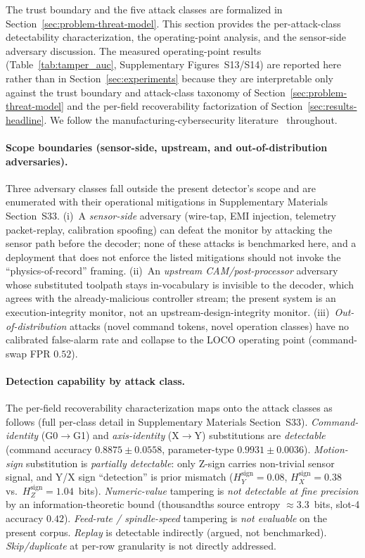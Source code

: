 \documentclass[sensors,article,submit,moreauthors,pdftex]{Definitions/mdpi}
\begin{document}
The trust boundary and the five attack classes are formalized in Section~\ref{sec:problem-threat-model}. This section provides the per-attack-class detectability characterization, the operating-point analysis, and the sensor-side adversary discussion. The measured operating-point results (Table~\ref{tab:tamper_auc}, Supplementary Figures~S13/S14) are reported here rather than in Section~\ref{sec:experiments} because they are interpretable only against the trust boundary and attack-class taxonomy of Section~\ref{sec:problem-threat-model} and the per-field recoverability factorization of Section~\ref{sec:results-headline}. We follow the manufacturing-cybersecurity literature~\cite{sturm2014cyber,yampolskiy2018security,kimmell2025cnc,zonouz2014plc,belikovetsky2017drowned,nist2023sp80082} throughout.

\paragraph{Scope boundaries (sensor-side, upstream, and out-of-distribution adversaries).} Three adversary classes fall outside the present detector's scope and are enumerated with their operational mitigations in Supplementary Materials Section~S33. (i)~A \emph{sensor-side} adversary (wire-tap, EMI injection, telemetry packet-replay, calibration spoofing) can defeat the monitor by attacking the sensor path before the decoder; none of these attacks is benchmarked here, and a deployment that does not enforce the listed mitigations should not invoke the ``physics-of-record'' framing. (ii)~An \emph{upstream CAM/post-processor} adversary whose substituted toolpath stays in-vocabulary is invisible to the decoder, which agrees with the already-malicious controller stream; the present system is an execution-integrity monitor, not an upstream-design-integrity monitor. (iii)~\emph{Out-of-distribution} attacks (novel command tokens, novel operation classes) have no calibrated false-alarm rate and collapse to the LOCO operating point (command-swap FPR $0.52$).

\paragraph{Detection capability by attack class.} The per-field recoverability characterization maps onto the attack classes as follows (full per-class detail in Supplementary Materials Section~S33). \emph{Command-identity} (G0$\to$G1) and \emph{axis-identity} (X$\to$Y) substitutions are \emph{detectable} (command accuracy $0.8875 \pm 0.0558$, parameter-type $0.9931 \pm 0.0036$). \emph{Motion-sign} substitution is \emph{partially detectable}: only Z-sign carries non-trivial sensor signal, and Y/X sign ``detection'' is prior mismatch ($H_{Y}^{\text{sign}}\!=\!0.08$, $H_{X}^{\text{sign}}\!=\!0.38$ vs.\ $H_{Z}^{\text{sign}}\!=\!1.04$~bits). \emph{Numeric-value} tampering is \emph{not detectable at fine precision} by an information-theoretic bound (thousandths source entropy $\approx 3.3$~bits, slot-4 accuracy $0.42$). \emph{Feed-rate / spindle-speed} tampering is \emph{not evaluable} on the present corpus. \emph{Replay} is detectable indirectly (argued, not benchmarked). \emph{Skip/duplicate} at per-row granularity is not directly addressed.
\end{document}
